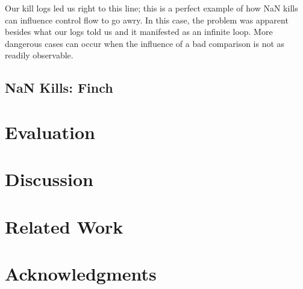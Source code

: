 \documentclass{juliacon}
\begin{document}
Our kill logs led us right to this line; this is a perfect example of how NaN kills can influence control flow to go awry.
In this case, the problem was apparent besides what our logs told us and it manifested as an infinite loop.
More dangerous cases can occur when the influence of a bad comparison is not as readily observable.

\subsection{NaN Kills: Finch}


\section{Evaluation}

\section{Discussion}

\section{Related Work}

\section{Acknowledgments}


\end{document}
